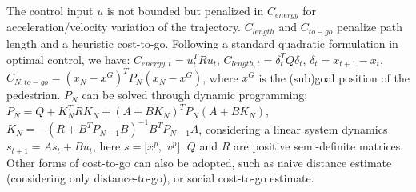 \documentclass[conference]{IEEEtran}
\begin{document}
The control input $u$ is not bounded but 
penalized in $C_{energy}$ for acceleration/velocity variation of the trajectory. 
$C_{length}$ and $C_{to-go}$ penalize path length and a heuristic cost-to-go. 
Following a standard quadratic formulation in optimal control, we have: $C_{energy,t}=u_t^TRu_t$, 
$C_{length,t}=\delta_t^TQ\delta_t$, $\delta_t = x_{t+1}-x_t$, 
$C_{N,to-go} = (x_N-x^G)^TP_N(x_N-x^G)$, where $x^G$ is the (sub)goal 
position of the pedestrian. $P_N$ can be solved through dynamic programming:
$P_N = Q + K_N^TRK_N + (A+BK_N)^TP_N(A+BK_N)$, 
$K_N = -(R+B^TP_{N-1}B)^{-1}B^TP_{N-1}A$, considering a linear system dynamics
$s_{t+1}= As_t+Bu_t$, here $s = [x^p,$ $v^p]$. $Q$ and $R$ are positive 
semi-definite matrices. Other forms of cost-to-go can also be adopted, such as 
naive distance estimate (considering only distance-to-go), or social 
cost-to-go estimate.
\end{document}
